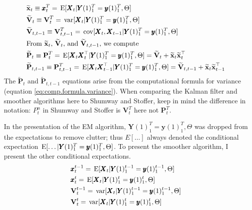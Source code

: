 \documentclass[]{article}
\def\E{\,\textup{\textrm{E}}}
\def\PP{\mbox{$\mathbf P$}}  \def\pp{\mbox{$\mathbf p$}}
\def\VV{\mbox{$\mathbf V$}}	\def\vv{\mbox{$\mathbf v$}}
\def\XX{\mbox{$\pmb{X}$}}	\def\xx{\mbox{$\pmb{x}$}}
\def\YY{\mbox{$\pmb{Y}$}}	\def\yy{\mbox{$\pmb{y}$}}
\def\var{\,\textup{\textrm{var}}}
\def\cov{\,\textup{\textrm{cov}}}
\def\hatxt{\widetilde{\mbox{$\mathbf x$}}_t}
\def\hatxtm{\widetilde{\mbox{$\mathbf x$}}_{t-1}}
\def\hatPt{\widetilde{\PP}_t}
\def\hatPttm{\widetilde{\PP}_{t,t-1}}
\begin{document}
\begin{subequations}\label{eq:kfsoutput}
\begin{align}
&\hatxt \equiv \xx_t^T = \E[\XX_t|\YY(1)_1^T=\yy(1)_1^T,\Theta]\label{eq:xt}\\
&\widetilde{\VV}_t \equiv \VV_t^T = \var[\XX_t|\YY(1)_1^T=\yy(1)_1^T,\Theta]\\
&\widetilde{\VV}_{t,t-1} \equiv \VV_{t,t-1}^T = \cov[\XX_t,\XX_{t-1}|\YY(1)_1^T=\yy(1)_1^T,\Theta]\\
&\text{From $\hatxt$, $\widetilde{\VV}_t$, and $\widetilde{\VV}_{t,t-1}$, we compute}\nonumber\\
&\hatPt \equiv \PP_t^T =\E[\XX_t\XX_t^\top|\YY(1)_1^T=\yy(1)_1^T,\Theta]= \widetilde{\VV}_t + \hatxt\hatxt^\top\label{eq:Pt}\\
&\hatPttm \equiv \PP_{t,t-1}^T =\E[\XX_{t}\XX_{t-1}^\top|\YY(1)_1^T=\yy(1)_1^T,\Theta]=\widetilde{\VV}_{t,t-1} +\hatxt\hatxtm^\top\label{eq:Ptt1}
\end{align}
\end{subequations}
The $\hatPt$ and $\hatPttm$ equations arise from the computational formula for variance (equation \ref{eq:comp.formula.variance}). When comparing the Kalman filter and smoother algorithms here to Shumway and Stoffer, keep in mind the difference in notation: $P_t^n$ in Shumway and Stoffer is $\VV_t^T$ here not $\PP_t^T$.

In the presentation of the EM algorithm, $\YY(1)_1^T=\yy(1)_1^T,\Theta$ was dropped from the expectations to remove clutter; thus $E[\dots]$ always denoted the conditional expectation $\E[\dots|\YY(1)_1^T=\yy(1)_1^T,\Theta]$. To present the smoother algorithm, I present the other conditional expectations.
\begin{subequations}\label{eq:kffilteroutput}
\begin{align}
&\xx_t^{t-1} = \E[\XX_t|\YY(1)_1^{t-1}=\yy(1)_1^{t-1},\Theta]\\
&\xx_t^t = \E[\XX_t|\YY(1)_1^t=\yy(1)_1^t,\Theta]\\
&\VV_t^{t-1} = \var[\XX_t|\YY(1)_1^{t-1}=\yy(1)_1^{t-1},\Theta]\\
&\VV_t^t = \var[\XX_t|\YY(1)_1^t=\yy(1)_1^t,\Theta]\\
\end{align}
\end{subequations}
\end{document}
